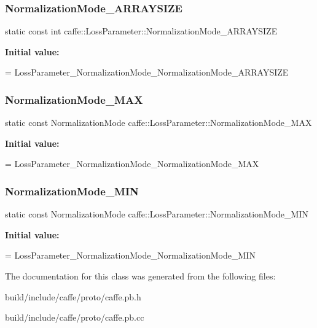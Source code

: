 \subsubsection{\texorpdfstring{Normalization\+Mode\+\_\+\+A\+R\+R\+A\+Y\+S\+I\+ZE}{NormalizationMode\_ARRAYSIZE}}
{\footnotesize\ttfamily static const int caffe\+::\+Loss\+Parameter\+::\+Normalization\+Mode\+\_\+\+A\+R\+R\+A\+Y\+S\+I\+ZE\hspace{0.3cm}{\ttfamily [static]}}

{\bfseries Initial value\+:}
\begin{DoxyCode}
=
    LossParameter\_NormalizationMode\_NormalizationMode\_ARRAYSIZE
\end{DoxyCode}
\mbox{\label{classcaffe_1_1_loss_parameter_a559083945b4425c0817e83575b6c056b}} 
\subsubsection{\texorpdfstring{Normalization\+Mode\+\_\+\+M\+AX}{NormalizationMode\_MAX}}
{\footnotesize\ttfamily static const Normalization\+Mode caffe\+::\+Loss\+Parameter\+::\+Normalization\+Mode\+\_\+\+M\+AX\hspace{0.3cm}{\ttfamily [static]}}

{\bfseries Initial value\+:}
\begin{DoxyCode}
=
    LossParameter\_NormalizationMode\_NormalizationMode\_MAX
\end{DoxyCode}
\mbox{\label{classcaffe_1_1_loss_parameter_ac1f3eb5ec173d228ed030021e677c5df}} 
\subsubsection{\texorpdfstring{Normalization\+Mode\+\_\+\+M\+IN}{NormalizationMode\_MIN}}
{\footnotesize\ttfamily static const Normalization\+Mode caffe\+::\+Loss\+Parameter\+::\+Normalization\+Mode\+\_\+\+M\+IN\hspace{0.3cm}{\ttfamily [static]}}

{\bfseries Initial value\+:}
\begin{DoxyCode}
=
    LossParameter\_NormalizationMode\_NormalizationMode\_MIN
\end{DoxyCode}


The documentation for this class was generated from the following files\+:\begin{DoxyCompactItemize}
\item 
build/include/caffe/proto/caffe.\+pb.\+h\item 
build/include/caffe/proto/caffe.\+pb.\+cc\end{DoxyCompactItemize}
